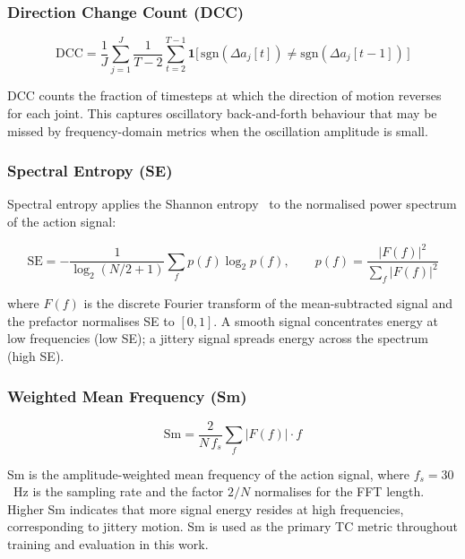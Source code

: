 \subsubsection{Direction Change Count (DCC)}

\begin{equation}
    \text{DCC} = \frac{1}{J} \sum_{j=1}^{J}
    \frac{1}{T-2} \sum_{t=2}^{T-1}
    \mathbf{1}\bigl[\,\mathrm{sgn}(\Delta a_j[t]) \neq \mathrm{sgn}(\Delta a_j[t-1])\,\bigr]
    \label{eq:dcc}
\end{equation}

DCC counts the fraction of timesteps at which the direction of motion reverses
for each joint. This captures oscillatory back-and-forth behaviour that may be
missed by frequency-domain metrics when the oscillation amplitude is small.

\subsubsection{Spectral Entropy (SE)}

Spectral entropy applies the Shannon entropy~\cite{shannon1948mathematical} to
the normalised power spectrum of the action signal:

\begin{equation}
    \text{SE} = -\frac{1}{\log_2(N/2+1)}
    \sum_{f} p(f)\log_2 p(f),
    \qquad
    p(f) = \frac{|F(f)|^2}{\sum_f |F(f)|^2}
    \label{eq:se}
\end{equation}

where $F(f)$ is the discrete Fourier transform of the mean-subtracted signal
and the prefactor normalises SE to $[0, 1]$. A smooth signal concentrates
energy at low frequencies (low SE); a jittery signal spreads energy across the
spectrum (high SE).

\subsubsection{Weighted Mean Frequency (Sm)}

\begin{equation}
    \text{Sm} = \frac{2}{N\,f_s} \sum_{f} |F(f)| \cdot f
    \label{eq:sm}
\end{equation}

Sm is the amplitude-weighted mean frequency of the action signal, where $f_s =
30$~Hz is the sampling rate and the factor $2/N$ normalises for the FFT length.
Higher Sm indicates that more signal energy resides at high frequencies,
corresponding to jittery motion. Sm is used as the primary TC metric throughout
training and evaluation in this work.

